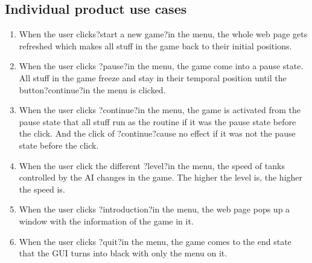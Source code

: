 \documentclass{article}
\begin{document}
\subsection {Individual product use cases}
\begin{enumerate}
\item When the user clicks?start a new game?in the menu, the whole web page gets
 refreshed which makes all stuff in the game back to their initial positions.

\item When the user clicks ?pause?in the menu, the game come into a pause state.
 All stuff in the game freeze and stay in their temporal position until the 
 button?continue?in the menu is clicked.

\item When the user clicks ?continue?in the menu, the game is activated from 
the pause state that all stuff run as the routine if it was the pause state 
before the click. And the click of ?continue?cause no effect if it was not the 
pause state before the click.

\item When the user click the different ?level?in the menu, the speed of tanks 
controlled by the AI changes in the game. The higher the level is, the higher 
the speed is.

\item When the user clicks ?introduction?in the menu, the web page pops up a 
window with the information of the game in it.

\item When the user clicks ?quit?in the menu, the game comes to the end state 
that the GUI turns into black with only the menu on it.


\end{enumerate}
\end{document}
